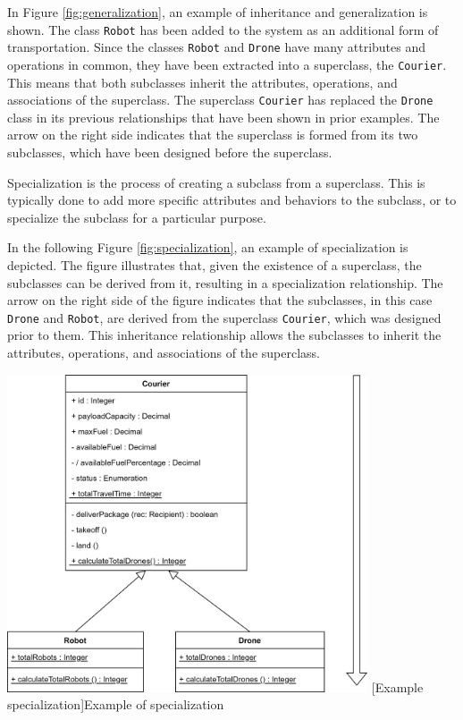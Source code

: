 \documentclass[
	12pt,
    a4paper,
    egregdoesnotlikesansseriftitles, %
    toc=chapterentrywithdots,
    oneside, openany,
    titlepage,
    parskip=half,
    headings=normal,  %
    listof=totoc,
    bibliography=totocnumbered,
    index=totoc,
    captions=tableheading,  %
    listof=flat,
    numbers=noenddot, %
    final]
    {scrbook}
\begin{document}
In Figure \ref{fig:generalization}, an example of inheritance and generalization is shown. 
The class \texttt{Robot} has been added to the system as an additional form of transportation. 
Since the classes \texttt{Robot} and \texttt{Drone} have many attributes and operations in common, they have been extracted into a superclass, the \texttt{Courier}.
This means that both subclasses inherit the attributes, operations, and associations of the superclass. 
The superclass \texttt{Courier} has replaced the \texttt{Drone} class in its previous relationships that have been shown in prior examples.
The arrow on the right side indicates that the superclass is formed from its two subclasses, which have been designed before the superclass.



Specialization is the process of creating a subclass from a superclass. This is typically done to add more specific attributes and behaviors to the subclass, or to specialize the subclass for a particular purpose.

In the following Figure \ref{fig:specialization}, an example of specialization is depicted. The figure illustrates that, given the existence of a superclass, the subclasses can be derived from it, resulting in a specialization relationship. 
The arrow on the right side of the figure indicates that the subclasses, in this case \texttt{Drone} and \texttt{Robot}, are derived from the superclass \texttt{Courier}, which was designed prior to them. 
This inheritance relationship allows the subclasses to inherit the attributes, operations, and associations of the superclass.



\vspace{1em}
\begin{minipage}{\linewidth}
	\centering
	\includegraphics[width=0.8\textwidth]{figures/inheritance/specialization.jpg}
	[Example specialization]{Example of specialization}
	\label{fig:specialization}
\end{minipage}
\vspace{1em}
\end{document}
